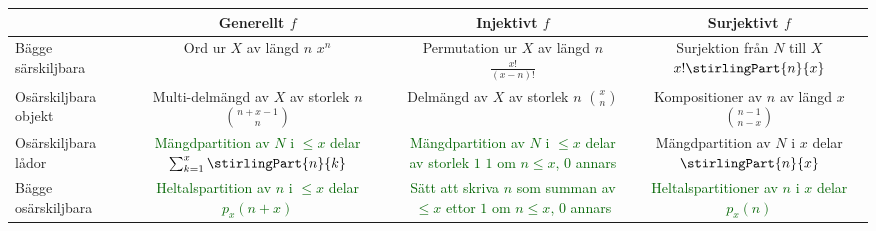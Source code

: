 \documentclass[nobib]{tufte-handout}
\begin{document}
\begin{fullwidth}
  \begin{tabularx}{\linewidth}{l|ccc}
      & Generellt $f$ & Injektivt $f$ & Surjektivt $f$\\
      \midrule
    Bägge särskiljbara & \specialcell{Ord ur $X$ av längd $n$\\ $x^n$} & \specialcell{Permutation ur $X$ av längd $n$\\ $\frac{x!}{(x-n)!}$} & \specialcell{Surjektion från $N$ till $X$\\$x!\stirlingPart{n}{x}$} \\
    Osärskiljbara objekt & \specialcell{Multi-delmängd av $X$\\ av storlek $n$\\$\binom{n + x - 1}{n}$} & \specialcell{Delmängd av $X$ av storlek $n$\\$\binom{x}{n}$} & \specialcell{Kompositioner av $n$\\av längd $x$\\$\binom{n - 1}{n - x}$} \\
    Osärskiljbara lådor & \specialcell{\textcolor{darkgreen}{Mängdpartition av $N$}\\ \textcolor{darkgreen}{ i $\leq x$ delar} \\\textcolor{darkgreen}{$\sum_{k=1}^{x} \stirlingPart{n}{k}$}} & \specialcell{\textcolor{darkgreen}{Mängdpartition av $N$}\\ \textcolor{darkgreen}{i $\leq x$ delar av storlek $1$}\\\textcolor{darkgreen}{$1$ om $n \leq x$, $0$ annars}} & \specialcell{Mängdpartition av $N$\\i $x$ delar\\$\stirlingPart{n}{x}$} \\
    Bägge osärskiljbara & \specialcell{\textcolor{darkgreen}{Heltalspartition av $n$ i $\leq x$ delar}\\\textcolor{darkgreen}{$p_x(n + x)$}} & \specialcell{\textcolor{darkgreen}{Sätt att skriva $n$ som}\\\textcolor{darkgreen}{summan av $\leq x$ ettor}\\\textcolor{darkgreen}{$1$ om $n \leq x$, $0$ annars}} & \specialcell{\textcolor{darkgreen}{Heltalspartitioner av $n$}\\ \textcolor{darkgreen}{i $x$ delar} \\\textcolor{darkgreen}{$p_x(n)$}} 
  \end{tabularx}
\end{fullwidth}
\end{document}
